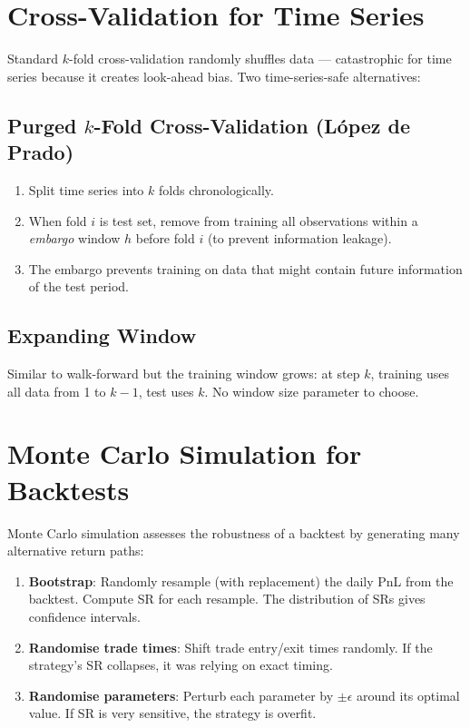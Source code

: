 \documentclass[12pt,a4paper,openany]{report}
\theoremstyle{definition}
\begin{document}
\section{Cross-Validation for Time Series}

Standard $k$-fold cross-validation randomly shuffles data — catastrophic for time series because it creates look-ahead bias. Two time-series-safe alternatives:

\subsection{Purged $k$-Fold Cross-Validation (L\'{o}pez de Prado)}

\begin{enumerate}[label=\arabic*.]
  \item Split time series into $k$ folds chronologically.
  \item When fold $i$ is test set, remove from training all observations within a \emph{embargo} window $h$ before fold $i$ (to prevent information leakage).
  \item The embargo prevents training on data that might contain future information of the test period.
\end{enumerate}

\subsection{Expanding Window}

Similar to walk-forward but the training window grows: at step $k$, training uses all data from 1 to $k-1$, test uses $k$. No window size parameter to choose.

\section{Monte Carlo Simulation for Backtests}

Monte Carlo simulation assesses the robustness of a backtest by generating many alternative return paths:

\begin{enumerate}[label=\arabic*.]
  \item \textbf{Bootstrap}: Randomly resample (with replacement) the daily PnL from the backtest. Compute SR for each resample. The distribution of SRs gives confidence intervals.
  \item \textbf{Randomise trade times}: Shift trade entry/exit times randomly. If the strategy's SR collapses, it was relying on exact timing.
  \item \textbf{Randomise parameters}: Perturb each parameter by $\pm\epsilon$ around its optimal value. If SR is very sensitive, the strategy is overfit.
\end{enumerate}
\end{document}
